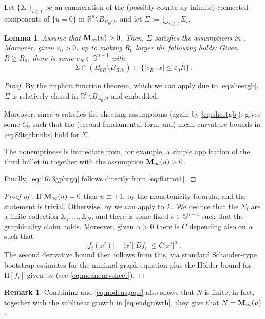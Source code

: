 \documentclass{article}
\newcommand{\R}{\mathbb{R}}
\newcommand{\Sp}{\mathbb{S}}
\newcommand{\ep}{\varepsilon}
\newtheorem{lemma}[theorem]{Lemma}
\theoremstyle{definition}
\newtheorem{remark}[theorem]{Remark}
\begin{document}
Let $\{\Sigma_i\}_{i\in I}$ be an enumeration of the (possibly countably infinite) connected components of $\{u=0\}$ in $\R^n\setminus \overline{B_{R_0/2}}$, and let $\Sigma:=\bigcup_{i\in I} \Sigma_i$.
\begin{lemma}\label{lem:9017oqiubg}
Assume that ${\bf M}_\infty(u)> 0$. Then, $\Sigma$ satisfies the assumptions in . Moreover, given $\ep_0>0$, up to making $R_0$ larger the following holds: Given $R\geq R_0$, there is some $e_R\in\Sp^{n-1}$ with
\begin{equation}\label{eq:1673gpbrgq}
    \Sigma \cap (B_{8R}\setminus \overline{B_{R/8}})\subset \{|e_R\cdot x|\leq \ep_0 R\}\,.
\end{equation}
\end{lemma}
\begin{proof}
    By the implicit function theorem, which we can apply due to \eqref{eq:sheetgb}, $\Sigma$ is relatively closed in $\R^n\setminus \overline{B_{R_0/2}}$ and embedded.

    Moreover, since $u$ satisfies the sheeting assumptions (again by \eqref{eq:sheetgb}),  gives some $C_0$ such that the (second fundamental form and) mean curvature bounds in \eqref{eq:89tqrbnnbs} hold for $\Sigma$.

    The nonemptiness is immediate from, for example, a simple application of the third bullet in  together with the assumption ${\bf M}_\infty(u)>0$.

    Finally, \eqref{eq:1673gpbrgq} follows directly from \eqref{eq:flatrot1}.
\end{proof}

\begin{proof}[Proof of ]
    If ${\bf M}_\infty(u)=0$ then $u\equiv\pm 1$, by the monotonicity formula, and the statement is trivial. Otherwise, by  we can apply  to $\Sigma$. We deduce that the $\Sigma_i$ are a finite collection $\Sigma_1,...,\Sigma_N$, and there is some fixed $e\in\Sp^{n-1}$ such that the graphicality claim holds. Moreover, given $\alpha>0$ there is $C$ depending also on $\alpha$ such that
    \begin{equation*}
         |f_i(x')|+|x'||D f_i| \leq C|x'|^{\alpha}\,.
    \end{equation*}
    The second derivative bound then follows from this, via standard Schauder-type bootstrap estimates for the minimal graph equation plus the H\"older bound for $\mathrm{H}[f_i]$ given by  (see \eqref{eq:meancurvsheet}).
\end{proof}
\begin{remark}\label{rmk:inftydens}
    Combining  and \eqref{eq:nodensgaps} also shows that $N$ is finite; in fact, together with the sublinear growth in \eqref{eq:endgrowth}, they give that $N={\bf M}_\infty(u)$.
\end{remark}
\end{document}
